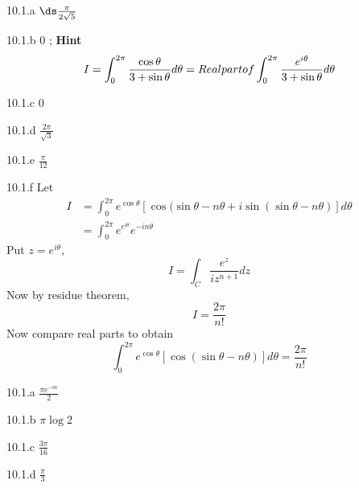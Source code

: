 \begin{Solution}{10.1.a}
	$\ds \frac{\pi}{2\sqrt{5}}$
	
\end{Solution}
\begin{Solution}{10.1.b}
	0 ; \textbf{Hint}
	\[I = \int_0^{2\pi}{\cos \theta \over 3+\sin\theta} d\theta = Real part of \int_0^{2\pi}{\frac{e^{i\theta}}{3+\sin\theta}} d\theta \]
	
\end{Solution}
\begin{Solution}{10.1.c}
	0
	
\end{Solution}
\begin{Solution}{10.1.d}
	$\frac{2\pi}{\sqrt{3}}$
	
\end{Solution}
\begin{Solution}{10.1.e}
	$\frac{\pi}{12}$
	
\end{Solution}
\begin{Solution}{10.1.f}
	Let
	\begin{align*}
	I &=\int_0^{2\pi} e^{\cos \theta}[\cos(\sin \theta - n \theta+ i\sin(\sin \theta - n \theta)]d\theta \\
		&= \int_0^{2\pi}e^{e^{i\theta}}e^{-in\theta}
\end{align*}
	Put $z=e^{i\theta}$,
	\[I = \int_C \frac{e^z}{iz^{n+1}}dz\]
	Now by residue theorem,
	\[I = \frac{2\pi}{n!}\]
	Now compare real parts to obtain
	\[\int_0^{2\pi} e^{\cos \theta}[\cos(\sin \theta - n \theta)]d\theta = \frac{2\pi}{n!}\]

	
\end{Solution}
\begin{Solution}{10.1.a}
$\frac{\pi e^{-m}}{2}$
\end{Solution}
\begin{Solution}{10.1.b}
$\pi \log 2$
\end{Solution}
\begin{Solution}{10.1.c}
$\frac{3\pi}{16}$
\end{Solution}
\begin{Solution}{10.1.d}
$\frac{\pi}{3}$
\end{Solution}
